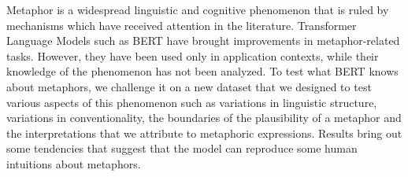 Metaphor is a widespread linguistic and cognitive phenomenon that is ruled by mechanisms which have received attention in the literature. Transformer Language Models such as BERT have brought improvements in metaphor-related tasks. However, they have been used only in application contexts, while their knowledge of the phenomenon has not been analyzed. To test what BERT knows about metaphors, we challenge it on a new dataset that we designed to test various aspects of this phenomenon such as variations in linguistic structure, variations in conventionality, the boundaries of the plausibility of a metaphor and the interpretations that we attribute to metaphoric expressions. Results bring out some tendencies that suggest that the model can reproduce some human intuitions about metaphors.
